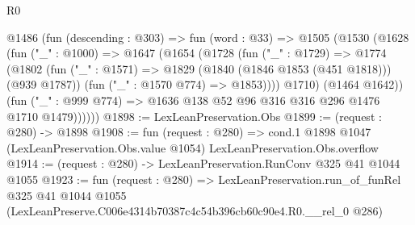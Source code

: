 \begin{lexlean}{R0}
\begin{coremodule}
      @1486
        (fun (descending : @303) =>
        fun (word : @33) =>
        @1505
          (@1530
            (@1628
              (fun ("_" : @1000) =>
              @1647
                (@1654
                  (@1728
                    (fun ("_" : @1729) =>
                    @1774
                      (@1802
                        (fun ("_" : @1571) => @1829 (@1840 (@1846 @1853 (@451 @1818))) (@939 @1787))
                        (fun ("_" : @1570 @774) => @1853))))
                  @1710)
                (@1464 @1642))
              (fun ("_" : @999 @774) => @1636 @138 @52 @96 @316 @316 @296 @1476 @1710 @1479))))))
@1898 := LexLeanPreservation.Obs
@1899 := (request : @280) -> @1898
@1908 := fun (request : @280) =>
  cond.{1} @1898 @1047 (LexLeanPreservation.Obs.value @1054) LexLeanPreservation.Obs.overflow
@1914 := (request : @280) -> LexLeanPreservation.RunConv @325 @41 @1044 @1055
@1923 := fun (request : @280) =>
  LexLeanPreservation.run_of_funRel
    @325
    @41
    @1044
    @1055
    (LexLeanPreserve.C006e4314b70387c4c54b396cb60c90e4.R0.__rel_0 @286)
\end{coremodule}
\end{lexlean}
